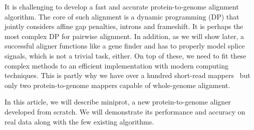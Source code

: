 \documentclass{bioinfo}
\begin{document}
It is challenging to develop a fast and accurate protein-to-genome alignment
algorithm. The core of such alignment is a dynamic programming (DP) that
jointly considers affine gap penalties, introns and frameshift. It is perhaps
the most complex DP for pairwise alignment. In addition, as we will show later,
a successful aligner functions like a gene finder and has to properly model
splice signals, which is not a trivial task, either. On top of these, we need
to fit these complex methods to an efficient implementation with modern
computing techniques. This is partly why we have over a hundred short-read
mappers~\citep{Alser:2021tk} but only two protein-to-genome mappers capable of
whole-genome alignment.

In this article, we will describe miniprot, a new protein-to-genome aligner
developed from scratch. We will demonstrate its performance and accuracy on
real data along with the few existing algorithms.
\end{document}

